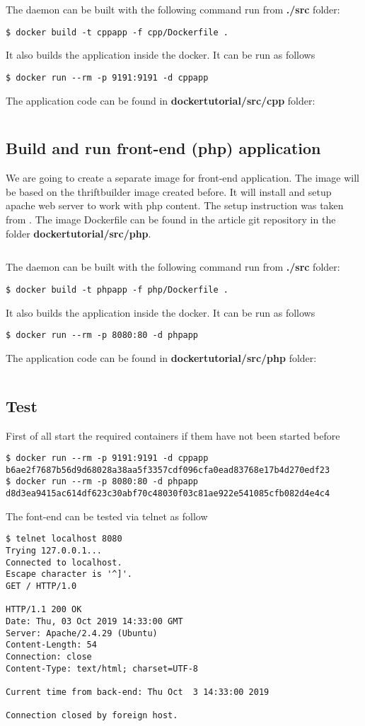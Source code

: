 \documentclass[14pt,a4paper]{article}
\begin{document}
The daemon can be built with the following command run from
\textbf{./src} folder:
\begin{verbatim}
$ docker build -t cppapp -f cpp/Dockerfile .
\end{verbatim}
It also builds the application inside the docker. It can be run as
follows
\begin{verbatim}
$ docker run --rm -p 9191:9191 -d cppapp
\end{verbatim}

The application code can be found in \textbf{dockertutorial/src/cpp} folder:
\inputminted{c++}{./src/cpp/main.cpp}


\subsection{Build and run front-end (php) application}
We are going to create a separate image for front-end application. The
image will be based on the thriftbuilder image created before.
It will install and setup apache web server to work with php content.
The setup instruction was taken from \cite{apache:php}.
The image Dockerfile can be found in the article git
repository \cite{github:articles_ivanmurashko} in the folder 
\textbf{dockertutorial/src/php}.
\inputminted{shell}{./src/php/Dockerfile}
The daemon can be built with the following command run from
\textbf{./src} folder:
\begin{verbatim}
$ docker build -t phpapp -f php/Dockerfile .
\end{verbatim}
It also builds the application inside the docker. It can be run as
follows
\begin{verbatim}
$ docker run --rm -p 8080:80 -d phpapp
\end{verbatim}

The application code can be found in \textbf{dockertutorial/src/php} folder:
\inputminted{php}{./src/php/index.php}

\subsection{Test}
First of all start the required containers if them have not been
started before
\begin{verbatim}
$ docker run --rm -p 9191:9191 -d cppapp
b6ae2f7687b56d9d68028a38aa5f3357cdf096cfa0ead83768e17b4d270edf23
$ docker run --rm -p 8080:80 -d phpapp
d8d3ea9415ac614df623c30abf70c48030f03c81ae922e541085cfb082d4e4c4
\end{verbatim}
The font-end can be tested via telnet as follow
\begin{verbatim}
$ telnet localhost 8080
Trying 127.0.0.1...
Connected to localhost.
Escape character is '^]'.
GET / HTTP/1.0

HTTP/1.1 200 OK
Date: Thu, 03 Oct 2019 14:33:00 GMT
Server: Apache/2.4.29 (Ubuntu)
Content-Length: 54
Connection: close
Content-Type: text/html; charset=UTF-8

Current time from back-end: Thu Oct  3 14:33:00 2019

Connection closed by foreign host.
\end{verbatim}
\end{document}
